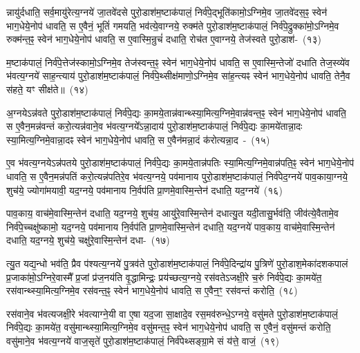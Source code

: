 न्नायु॑र्दधाति॒ सर्व॒मायु॑रेत्य॒ग्नये॑ जा॒तवे॑दसे पुरो॒डाश॑\-म॒ष्टा\-क॑पालं॒ निर्व॑पे॒द्भूति॑कामो॒\-ऽग्निमे॒व जा॒तवे॑दस॒ꣴ॒ स्वेन॑ भाग॒धेये॒नोप॑ धावति॒ स ए॒वैनं॒ भूतिं॑ गमयति॒ भव॑त्ये॒वाग्नये॒ रुक्म॑ते पुरो॒डाश॑\-म॒ष्टा\-क॑पालं॒ निर्व॑पे॒द्रुक्का॑मो॒\-ऽग्निमे॒व रुक्म॑न्त॒ꣴ॒ स्वेन॑ भाग॒धेये॒नोप॑ धावति॒ स ए॒वास्मि॒न्रुचं॑ दधाति॒ रोच॑त ए॒वाग्नये॒ तेज॑स्वते पुरो॒डाश॑-~(१३)

म॒ष्टा\-क॑पालं॒ निर्व॑पे॒त्तेज॑स्कामो॒\-ऽग्निमे॒व तेज॑स्वन्त॒ꣴ॒ स्वेन॑ भाग॒धेये॒नोप॑ धावति॒ स ए॒वास्मि॒न्तेजो॑ दधाति तेज॒स्व्ये॑व भ॑वत्य॒ग्नये॑ साह॒न्त्याय॑ पुरो॒डाश॑\-म॒ष्टा\-क॑पालं॒ निर्व॑पे॒थ्सीक्ष॑माणो॒\-ऽग्निमे॒व सा॑ह॒न्त्यꣴ स्वेन॑ भाग॒धेये॒नोप॑ धावति॒ तेनै॒व स॑हते॒ यꣳ सीक्ष॑ते॥~(१४)

{\anuvakamend[{भ्रातृ॑व्यस्यास्मि॒न्तेज॑स्वते पुरो॒डाश॑\-म॒ष्टात्रिꣳ॑शच्च}]}%

अ॒ग्नये\-ऽन्न॑वते पुरो॒डाश॑\-म॒ष्टा\-क॑पालं॒ निर्व॑पे॒द्यः का॒मये॒तान्न॑\-वान्थ्स्या॒मित्य॒ग्नि\-मे॒वान्न॑वन्त॒ꣴ॒ स्वेन॑ भाग॒धेये॒नोप॑ धावति॒ स ए॒वैन॒मन्न॑वन्तं करो॒त्यन्न॑वाने॒व भ॑वत्य॒ग्नये᳚\-ऽन्ना॒दाय॑ पुरो॒डाश॑\-म॒ष्टाक॑पालं॒ निर्व॑पे॒द्यः का॒मये॑तान्ना॒दः स्या॒मित्य॒ग्निमे॒वान्ना॒दꣴ स्वेन॑ भाग॒धेये॒नोप॑ धावति॒ स ए॒वैन॑मन्ना॒दं क॑रोत्यन्ना॒द~-~(१५)

ए॒व भ॑वत्य॒ग्नये\-ऽन्न॑पतये पुरो॒डाश॑\-म॒ष्टा\-क॑पालं॒ निर्व॑पे॒द्यः का॒मये॒तान्न॑पतिः स्या॒मित्य॒ग्निमे॒वान्न॑पति॒ꣴ॒ स्वेन॑ भाग॒धेये॒नोप॑ धावति॒ स ए॒वैन॒मन्न॑पतिं करो॒त्यन्न॑पतिरे॒व भ॑वत्य॒ग्नये॒ पव॑मानाय पुरो॒डाश॑\-म॒ष्टा\-क॑पालं॒ निर्व॑पेद॒ग्नये॑ पाव॒काया॒ग्नये॒ शुच॑ये॒ ज्योगा॑मयावी॒ यद॒ग्नये॒ पव॑मानाय नि॒र्वप॑ति प्रा॒णमे॒वास्मि॒न्तेन॑ दधाति॒ यद॒ग्नये॑~(१६)

पाव॒काय॒ वाच॑मे॒वास्मि॒न्तेन॑ दधाति॒ यद॒ग्नये॒ शुच॑य॒ आयु॑रे॒वास्मि॒न्तेन॑ दधात्यु॒त यदी॒तासु॒र्भव॑ति॒ जीव॑त्ये॒वैतामे॒व निर्व॑पे॒च्चक्षु॑ष्कामो॒ यद॒ग्नये॒ पव॑मानाय नि॒र्वप॑ति प्रा॒णमे॒वा\-स्मि॒न्तेन॑ दधाति॒ यद॒ग्नये॑ पाव॒काय॒ वाच॑मे॒वास्मि॒न्तेन॑ दधाति॒ यद॒ग्नये॒ शुच॑ये॒ चक्षु॑रे॒वास्मि॒न्तेन॑ दधा-~(१७)

त्यु॒त यद्य॒न्धो भव॑ति॒ प्रैव प॑श्यत्य॒ग्नये॑ पु॒त्रव॑ते पुरो॒डाश॑\-म॒ष्टा\-क॑पालं॒ निर्व॑पे॒दिन्द्रा॑य पु॒त्रिणे॑ पुरो॒डाश॒मेका॑\-दश\-कपालं प्र॒जाका॑मो़॒\-ऽग्निरे॒वास्मै᳚ प्र॒जां प्र॑ज॒नय॑ति वृ॒द्धामिन्द्रः॒ प्रय॑च्छत्य॒ग्नये॒ रस॑वते\-ऽजक्षी॒रे च॒रुं निर्व॑पे॒द्यः का॒मये॑त॒ रस॑वान्थ्स्या॒मित्य॒ग्निमे॒व रस॑वन्त॒ꣴ॒ स्वेन॑ भाग॒धेये॒नोप॑ धावति॒ स ए॒वैन॒ꣳ॒ रस॑वन्तं करोति॒~(१८)

रस॑वाने॒व भ॑वत्यजक्षी॒रे भ॑वत्याग्ने॒यी वा ए॒षा यद॒जा सा॒क्षादे॒व रस॒मव॑\-रुन्धे॒\-ऽग्नये॒ वसु॑मते पुरो॒डाश॑\-म॒ष्टा\-क॑पालं॒ निर्व॑पे॒द्यः का॒मये॑त॒ वसु॑मान्थ्स्या॒मित्य॒ग्निमे॒व वसु॑मन्त॒ꣴ॒ स्वेन॑ भाग॒धेये॒नोप॑ धावति॒ स ए॒वैनं॒ वसु॑मन्तं करोति॒ वसु॑माने॒व भ॑वत्य॒ग्नये॑ वाज॒सृते॑ पुरो॒डाश॑\-म॒ष्टा\-क॑पालं॒ निर्व॑पेथ्सङ्ग्रा॒मे सं य॑त्ते॒ वाजं॒~(१९)

